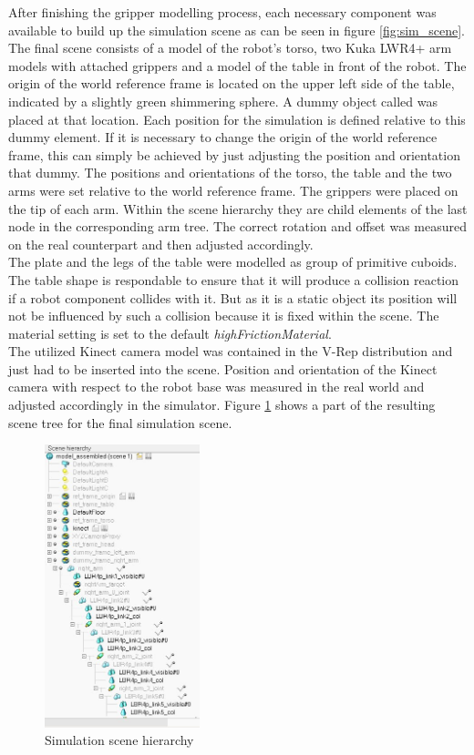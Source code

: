 After finishing the gripper modelling process, each necessary component was available to build up the simulation scene as can be seen in figure \ref{fig:sim_scene}. The final scene consists of a model of the robot's torso, two Kuka LWR4+ arm models with attached grippers and a model of the table in front of the robot. The origin of the world reference frame is located on the upper left side of the table, indicated by a slightly green shimmering sphere. A dummy object called  was placed at that location. Each position for the simulation is defined relative to this dummy element. If it is necessary to change the origin of the world reference frame, this can simply be achieved by just adjusting the position and orientation that dummy. The positions and orientations of the torso, the table and the two arms were set relative to the world reference frame. The grippers were placed on the tip of each arm. Within the scene hierarchy they are child elements of the last node in the corresponding arm tree. The correct rotation and offset was measured on the real counterpart and then adjusted accordingly. \\

The plate and the legs of the table were modelled as group of primitive cuboids. The table shape is respondable to ensure that it will produce a collision reaction if a robot component collides with it. But as it is a static object its position will not be influenced by such a collision because it is fixed within the scene. The material setting is set to the default \emph{highFrictionMaterial}. \\

The utilized Kinect camera model was contained in the V-Rep distribution and just had to be inserted into the scene. Position and orientation of the Kinect camera with respect to the robot base was measured in the real world and adjusted accordingly in the simulator. Figure \ref{fig:sim_scene_tree} shows a part of the resulting scene tree for the final simulation scene. 

\begin{figure}[h]
	\centering
  	\includegraphics[width=0.4\textwidth]{images/scene_tree.jpg}
	\caption{Simulation scene hierarchy}
	\label{fig:sim_scene_tree}
\end{figure}


